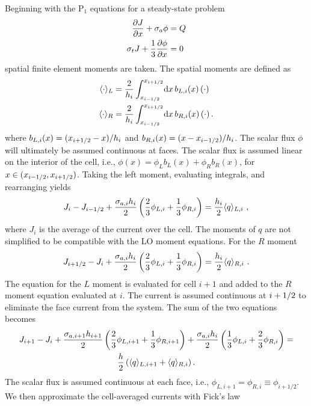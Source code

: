 Beginning with the P$_1$ equations for a steady-state problem
\begin{align}\label{eq:dsa_bal}
    \frac{\partial J}{\partial x} + \sigma_a \phi &= Q \\ \label{eq:p1}
    \sigma_t J + \frac{1}{3} \frac{\partial \phi}{\partial x} &= 0 \\
\end{align}
spatial finite element moments are taken. The spatial moments are defined as
\begin{align}
    \langle \cdot \rangle_L &= \frac{2}{h_i} \int_{{x_{i-1/2}}}^{{x_{i+1/2}}} \! \mathrm{d} x \,b_{L,i}(x)    \left( \cdot \right) \\
    \langle \cdot \rangle_R &= \frac{2}{h_i} \int_{{x_{i-1/2}}}^{{x_{i+1/2}}} \! \mathrm{d} x \,b_{R,i}(x) \left( \cdot \right).
\end{align}
where $b_{L,i}(x) = ({x_{i+1/2}} - x)/h_i$ and $b_{R,i}(x) = (x - {x_{i-1/2}})/h_i$.
The scalar flux $\phi$ will ultimately be assumed continuous at faces. The scalar
flux is assumed linear on the interior of the cell, i.e.,
$\phi(x)=\phi_Lb_L(x) + \phi_Rb_R(x)$, for $x\in({x_{i-1/2}},{x_{i+1/2}})$.   Taking the left moment,
evaluating integrals, and rearranging yields
\begin{equation}
    J_{i} - J_{{i-1/2}}  + \frac{\sigma_{a,i}h_i}{2} \left(\frac{2}{3} \phi_{L,i} + \frac{1}{3}
    \phi_{R,i} \right) = \frac{h_i}{2} \langle q \rangle_{L,i}\,\,,
\end{equation}
where $J_i$ is the average of the current over the cell. The moments of $q$ are
not simplified to be compatible with the LO moment equations. For the $R$ moment
\begin{equation}
    J_{i+1/2} - J_{i}  + \frac{\sigma_{a,i}h_i}{2} \left(\frac{2}{3} \phi_{L,i} + \frac{1}{3}
    \phi_{R,i} \right) = \frac{h_i}{2} \langle q \rangle_{R,i}\,\,.
\end{equation}
The equation for the $L$ moment is evaluated for cell $i+1$ and added to the $R$ moment
equation evaluated at $i$.  The current is assumed continuous at ${i+1/2}$ to eliminate
the face current from the system.  The sum of the two equations becomes
\begin{multline}
    J_{i+1} - J_{i} + \frac{\sigma_{a,i+1} h_{i+1}}{2}\left(\frac{2}{3} \phi_{L,i+1} +
    \frac{1}{3}\phi_{R,i+1}\right) + \frac{\sigma_{a,i} h_i}{2} \left( \frac{1}{3} \phi_{L,i} +
    \frac{2}{3}\phi_{R,i}\right) =\\ \frac{h}{2} \left(\langle q \rangle_{L,i+1} + \langle q \rangle_{R,i}
    \right).
\end{multline}
The scalar flux is assumed continuous at each face, i.e., $\phi_{L,i+1} = \phi_{R,i}
\equiv \phi_{i+1/2}$.  We then approximate the cell-averaged currents with Fick's law
